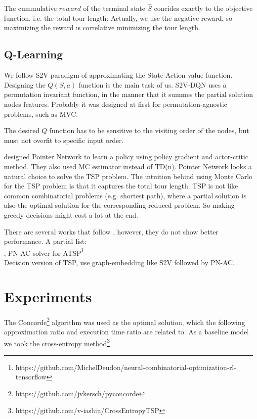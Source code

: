 \documentclass[10pt,a4paper,draft]{article}
\begin{document}
The cummulative $reward$ of the terminal state $\hat{S}$ concides exactly to the objective function, i.e. the total tour length:
Actually, we use the negative reward, so maximizing the reward is correlative minimizing the tour length.

\subsection*{Q-Learning}
We follow S2V paradigm of approximating the State-Action value function.
Designing the $Q(S,a)$ function is the main task of us. S2V-DQN uses a permutation invariant function, in the manner that it summes the partial solution nodes features. Probably it was designed at first for permutation-agnostic problems, such as MVC.

The desired $Q$ function has to be sensitive to the visiting order of the nodes, but must not overfit to specific input order. 

\cite{Bello} designed Pointer Network to learn a policy using policy gradient and actor-critic method. They also used MC estimator instead of TD(n). Pointer Network looks a natural choice to solve the TSP problem. The intuition behind using Monte Carlo for the TSP problem is that it captures the total tour length. TSP is not like common combinatorial problems (e.g. shortest path), where a partial solution is also the optimal solution for the corresponding reduced problem. So making greedy decisions might cost a lot at the end.
 
There are several works that follow \cite{Bello}, however, they do not show better performance. 
A partial list: \\

\cite{deudon-policy-gradient}, PN-AC-solver for ATSP\footnote{https://github.com/MichelDeudon/neural-combinatorial-optimization-rl-tensorflow}  \\

Decision version of TSP, use graph-embedding like S2V followed by PN-AC.





\section*{Experiments}
	The Concorde\footnote{https://github.com/jvkersch/pyconcorde} algorithm was used as the optimal solution, which the following approximation ratio and execution time ratio are related to. As a baseline model we took the cross-entropy method\footnote{https://github.com/v-iashin/CrossEntropyTSP}
\end{document}
